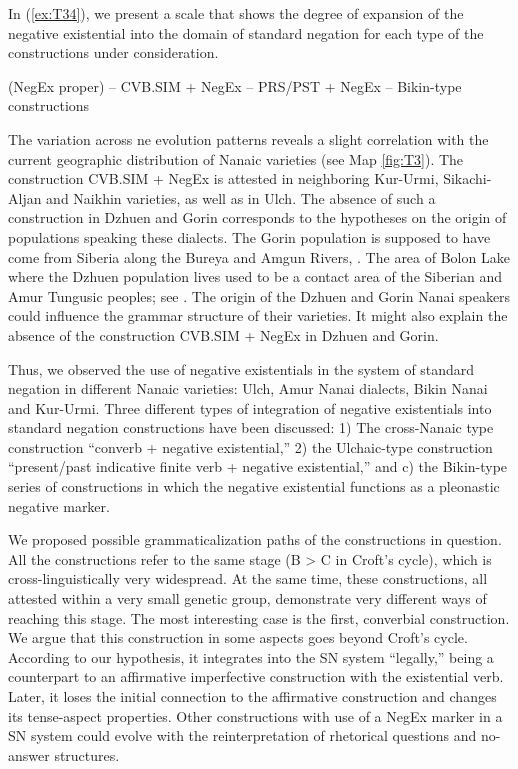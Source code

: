 \documentclass[output=paper]{langscibook}
\begin{document}
In (\ref{ex:T34}), we present a scale that shows the degree of expansion of the negative existential into the domain of standard negation for each type of the constructions under consideration.

\begin{exe}\label{ex:T34}
    \ex (NegEx proper) – CVB.SIM + NegEx – PRS/PST + NegEx – Bikin-type constructions
\end{exe}

The variation across ne evolution patterns reveals a slight correlation with the current geographic distribution of Nanaic varieties (see Map \ref{fig:T3}). The construction CVB.SIM + NegEx is attested in neighboring Kur-Urmi, Sikachi-Aljan and Naikhin varieties, as well as in Ulch. The absence of such a construction in Dzhuen and Gorin corresponds to the hypotheses on the origin of populations speaking these dialects. The Gorin population is supposed to have come from Siberia along the Bureya and Amgun Rivers, \citet[135]{maltseva2019a}. The area of Bolon Lake where the Dzhuen population lives used to be a contact area of the Siberian and Amur Tungusic peoples; see \citet{maltseva2019a}. The origin of the Dzhuen and Gorin Nanai speakers could influence the grammar structure of their varieties. It might also explain the absence of the construction CVB.SIM + NegEx in Dzhuen and Gorin.

Thus, we observed the use of negative existentials in the system of standard negation in different Nanaic varieties: Ulch, Amur Nanai dialects, Bikin Nanai and Kur-Urmi. Three different types of integration of negative existentials into standard negation constructions have been discussed: 1) The cross-Nanaic type construction “converb + negative existential,” 2) the Ulchaic-type construction “present/past indicative finite verb + negative existential,” and c) the Bikin-type series of constructions in which the negative existential functions as a pleonastic negative marker.

We proposed possible grammaticalization paths of the constructions in question. All the constructions refer to the same stage (B > C in Croft’s cycle), which is cross-linguistically very widespread. At the same time, these constructions, all attested within a very small genetic group, demonstrate very different ways of reaching this stage. The most interesting case is the first, converbial construction. We argue that this construction in some aspects goes beyond Croft’s cycle. According to our hypothesis, it integrates into the SN system “legally,” being a counterpart to an affirmative imperfective construction with the existential verb. Later, it loses the initial connection to the affirmative construction and changes its tense-aspect properties. Other constructions with use of a NegEx marker in a SN system could evolve with the reinterpretation of rhetorical questions and no-answer structures.
\end{document}
